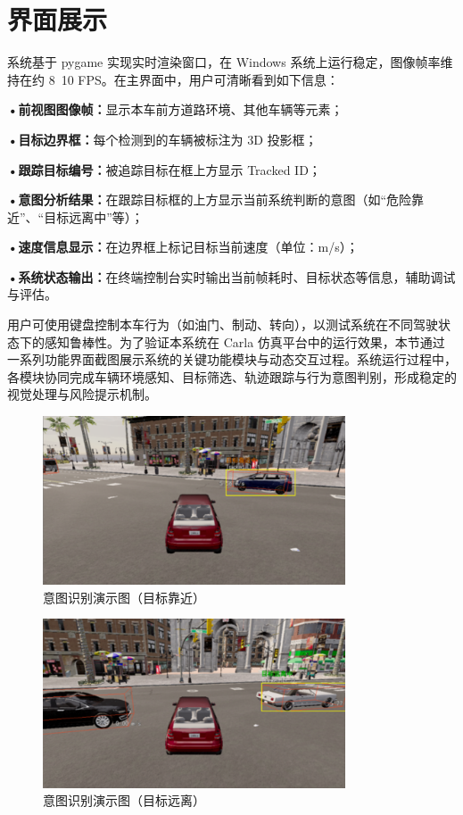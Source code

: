 \section{界面展示}

系统基于 pygame 实现实时渲染窗口，在 Windows 系统上运行稳定，图像帧率维持在约 8~10 FPS。在主界面中，用户可清晰看到如下信息：

\textbf{•前视图图像帧：}显示本车前方道路环境、其他车辆等元素；

\textbf{•目标边界框：}每个检测到的车辆被标注为 3D 投影框；

\textbf{•跟踪目标编号：}被追踪目标在框上方显示 Tracked ID；

\textbf{•意图分析结果：}在跟踪目标框的上方显示当前系统判断的意图（如“危险靠近”、“目标远离中”等）；

\textbf{•速度信息显示：}在边界框上标记目标当前速度（单位：m/s）；

\textbf{•系统状态输出：}在终端控制台实时输出当前帧耗时、目标状态等信息，辅助调试与评估。

用户可使用键盘控制本车行为（如油门、制动、转向），以测试系统在不同驾驶状态下的感知鲁棒性。为了验证本系统在 Carla 仿真平台中的运行效果，本节通过一系列功能界面截图展示系统的关键功能模块与动态交互过程。系统运行过程中，各模块协同完成车辆环境感知、目标筛选、轨迹跟踪与行为意图判别，形成稳定的视觉处理与风险提示机制。

\begin{figure}[H]
    \centering
    \includegraphics[width=0.8\textwidth]{images/图13 意图识别演示图（目标靠近）.pdf}  %
    \caption{意图识别演示图（目标靠近）}
    \label{fig:example_image}  %
\end{figure}

\begin{figure}[H]
    \centering
    \includegraphics[width=0.8\textwidth]{images/图14 意图识别演示图（目标远离）.pdf}  %
    \caption{意图识别演示图（目标远离）}
    \label{fig:example_image}  %
\end{figure}

